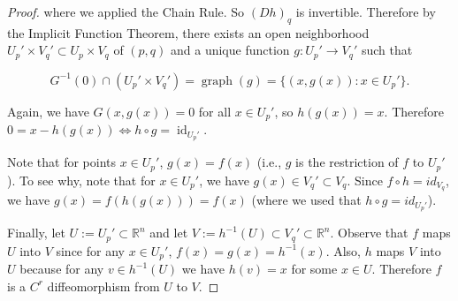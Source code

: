 \begin{proof}
 

%
 
where we applied the Chain Rule. So \((Dh)_q\) is invertible. Therefore by the Implicit Function Theorem, there exists an open neighborhood \(U_p' \times V_q' \subset U_p \times V_q\) of \((p,q)\) and a unique function \(g: U_p' \to V_q'\) such that

\[
G^{-1}(0) \cap (U_p' \times V_q') = \operatorname{graph}(g) = \{(x,g(x)) : x \in U_p' \}.
\]

Again, we have \(G(x, g(x)) = 0\) for all \(x \in U_p'\), so \(h(g(x)) = x\). Therefore \(0 = x - h(g(x))  \iff h \circ g = \operatorname{id}_{U_p'}\). 

Note that for points \(x \in U_p'\), \(g(x) = f(x)\) (i.e., \(g\) is the restriction of \(f\) to \(U_p'\)). To see why, note that for \(x \in U_p'\), we have \(g(x) \in V_q' \subset V_q\). Since \(f \circ h = id_{V_q}\), we have \(g(x) = f(h(g(x))) = f(x)\) (where we used that \(h \circ g = id_{U_p'}\)).

Finally, let \(U := U_p' \subset \mathbb{R}^n\) and let \(V:= h^{-1}(U) \subset V_q' \subset \mathbb{R}^n\). Observe that \(f\) maps \(U\) into \(V\) since for any \(x \in U_p'\), \(f(x) = g(x) = h^{-1}(x)\). Also, \(h\) maps \(V\) into \(U\) because for any \(v \in h^{-1}(U)\) we have \(h(v) = x\) for some \(x \in U\). Therefore \(f\) is a \(C^r\) diffeomorphism from \(U\) to \(V\).

%



\end{proof}

